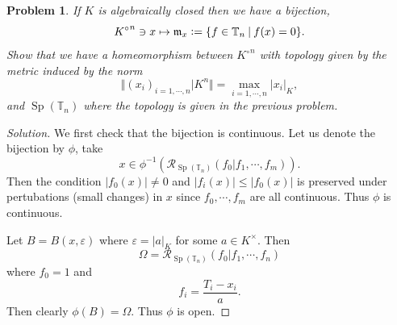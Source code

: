\documentclass[8pt]{article}
\numberwithin{equation}{section}
\newenvironment{solution}{\begin{proof}[Solution]}{\end{proof}}
\newtheorem{problem}{Problem}[section]
\DeclareMathOperator{\Sp}{Sp}
\newcommand{\defeq}{\vcentcolon=}
\newcommand{\norm}[1]{\Vert #1 \Vert}
\newcommand{\m}[0]{\mathfrak{m}}
\newcommand{\T}[0]{\mathbb{T}}
\newcommand{\cR}[0]{\mathcal{R}}
\newcommand{\sep}[0]{\:|\:}
\newcommand{\ab}[1]{\vert #1 \vert}
\begin{document}
\begin{problem}
  If $K$ is algebraically closed then we have a bijection,
  \begin{equation*}
    {K^\circ}^n\ni x\mapsto \m_x \defeq\{f\in\T_n\sep f(x)=0\}.
  \end{equation*}
  Show that we have a homeomorphism between ${K^\circ}^n$ with topology given by the metric induced by the norm
  \begin{equation*}
    \norm{(x_i)_{i=1,\cdots,n}|K^n} = \max_{i=1,\cdots,n}\ab{x_i}_K,
  \end{equation*}
  and $\Sp(\T_n)$ where the topology is given in the previous problem.
\end{problem}
\begin{solution}
  We first check that the bijection is continuous. Let us denote the bijection by $\phi$, take
  \begin{equation*}
    x\in \phi^{-1}(\cR_{\Sp(\T_n)}(f_0|f_1,\cdots,f_m)).
  \end{equation*}
  Then the condition $\ab{f_0(x)}\not=0$ and $\ab{f_i(x)}\leq \ab{f_0(x)}$ is preserved under pertubations (small changes) in $x$ since $f_0,\cdots,f_m$ are all continuous. Thus $\phi$ is continuous.
  \par Let $B=B(x,\varepsilon)$ where $\varepsilon = \ab{a}_K$ for some $a\in K^\times$. Then 
  \begin{equation*}
    \Omega = \cR_{\Sp(\T_n)}(f_0|f_1,\cdots,f_n)
  \end{equation*}
  where $f_0 = 1$ and
  \begin{equation*}
    f_i = {\frac {T_i-x_i} a}.
  \end{equation*}
  Then clearly $\phi(B)=\Omega$. Thus $\phi$ is open.
\end{solution}
\end{document}
